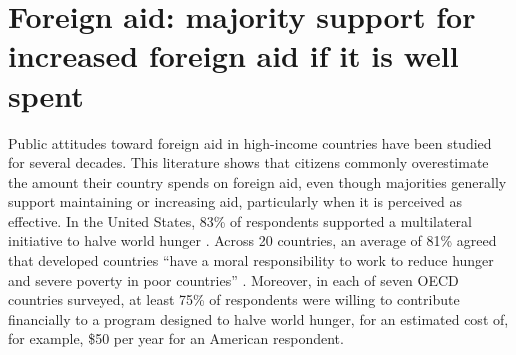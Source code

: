 
\section{Foreign aid: majority support for increased foreign aid if it is well spent}

Public attitudes toward foreign aid in high-income countries have been studied for several decades. This literature shows that citizens commonly overestimate the amount their country spends on foreign aid, even though majorities generally support maintaining or increasing aid, particularly when it is perceived as effective. In the United States, 83\% of respondents supported a multilateral initiative to halve world hunger \citep{PIPA2001}. Across 20 countries, an average of 81\% agreed that developed countries ``have a moral responsibility to work to reduce hunger and severe poverty in poor countries'' \citep{PIPA2008}. Moreover, in each of seven OECD countries surveyed, at least 75\% of respondents were willing to contribute financially to a program designed to halve world hunger, for an estimated cost of, for example, \$50 per year for an American respondent.



